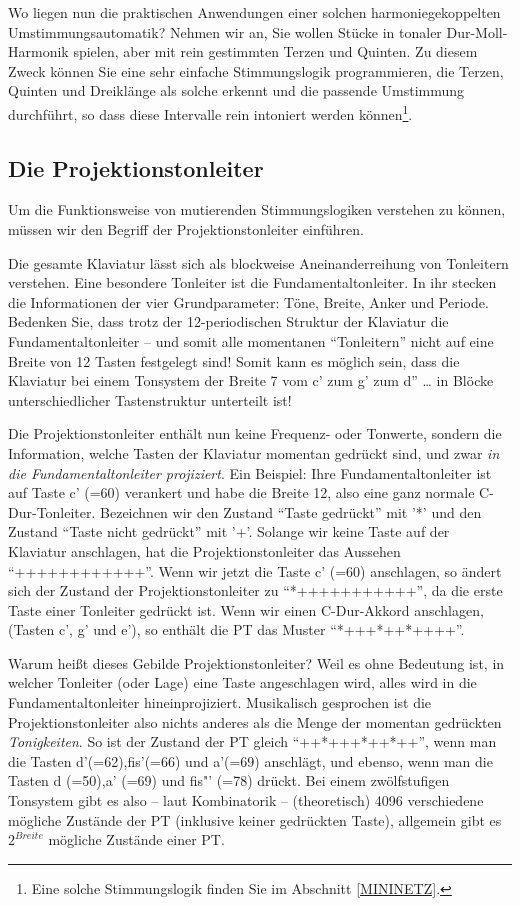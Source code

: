 Wo liegen nun die praktischen Anwendungen einer solchen
harmoniegekoppelten Umstimmungsautomatik?  Nehmen wir an, Sie wollen
Stücke in tonaler Dur-Moll-Harmonik spielen, aber mit rein gestimmten
Terzen und Quinten. Zu diesem Zweck können Sie eine sehr einfache
Stimmungslogik programmieren, die Terzen, Quinten und Dreiklänge als
solche erkennt und die passende Umstimmung durchführt, so dass diese
Intervalle rein intoniert werden können\footnote{Eine solche
  Stimmungslogik finden Sie im Abschnitt \ref{MININETZ}.}.

\subsection{Die Projektionstonleiter}\label{sec:die-proj}
Um die Funktionsweise von mutierenden Stimmungslogiken verstehen
zu können, müssen wir den Begriff der Projektionstonleiter
einführen.

Die gesamte Klaviatur lässt sich als blockweise Aneinanderreihung von
Tonleitern verstehen. Eine besondere Tonleiter ist die
Fundamentaltonleiter. In ihr stecken die Informationen der vier
Grundparameter: Töne, Breite, Anker und Periode. Bedenken Sie, dass
trotz der 12-periodischen Struktur der Klaviatur die
Fundamentaltonleiter -- und somit alle momentanen "`Tonleitern"' nicht
auf eine Breite von 12 Tasten festgelegt sind! Somit kann es möglich
sein, dass die Klaviatur bei einem Tonsystem der Breite 7 vom c' zum g'
zum d'' \dots{} in Blöcke unterschiedlicher Tastenstruktur unterteilt ist!

Die Projektionstonleiter enthält nun keine Frequenz- oder Tonwerte,
sondern die Information, welche Tasten der Klaviatur momentan
gedrückt sind, und zwar \emph{in die Fundamentaltonleiter projiziert}. Ein Beispiel: Ihre
Fundamentaltonleiter ist auf Taste c' (=60) verankert und habe die Breite 12, also
eine ganz normale C-Dur-Tonleiter. Bezeichnen wir den Zustand
"`Taste gedrückt"' mit '*' und den Zustand "`Taste nicht gedrückt"'
mit '+'. Solange wir keine Taste auf der Klaviatur anschlagen, hat die
Projektionstonleiter das Aussehen "`++++++++++++"'. Wenn wir jetzt die
Taste c' (=60) anschlagen, so ändert sich der Zustand der
Projektionstonleiter zu "`*+++++++++++"', da die erste Taste einer
Tonleiter gedrückt ist.
Wenn wir einen C-Dur-Akkord anschlagen, (Tasten c', g' und e'), so
enthält die PT das Muster "`*+++*++*++++"'.

Warum heißt dieses Gebilde Projektionstonleiter? Weil es ohne
Bedeutung ist, in welcher Tonleiter (oder Lage) eine Taste
angeschlagen wird, alles
wird in die Fundamentaltonleiter hineinprojiziert. Musikalisch gesprochen ist die
Projektionstonleiter also nichts anderes als die Menge der momentan
gedrückten \emph{Tonigkeiten}. So ist der Zustand der PT gleich
"`++*+++*++*++"', wenn man die Tasten d'(=62),fis'(=66) und a'(=69)
anschlägt, und ebenso, wenn man die Tasten d (=50),a' (=69) und fis"'
(=78) drückt. Bei einem zwölfstufigen Tonsystem gibt es also -- laut
Kombinatorik -- (theoretisch) 4096 verschiedene mögliche Zustände der
PT (inklusive keiner gedrückten Taste), allgemein gibt es $2^{Breite}$
mögliche Zustände einer PT.

